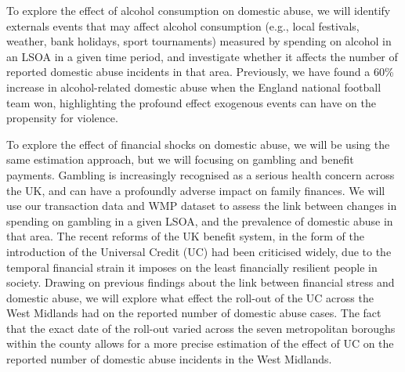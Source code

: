 \documentclass[11pt, a4paper]{article}
\begin{document}
To explore the effect of alcohol consumption on domestic abuse, we will identify externals events that may affect alcohol consumption (e.g., local festivals, weather, bank holidays, sport tournaments) measured by spending on alcohol in an LSOA in a given time period, and investigate whether it affects the number of reported domestic abuse incidents in that area. Previously, we have found a 60\% increase in alcohol-related domestic abuse when the England national football team won, highlighting the profound effect exogenous events can have on the propensity for violence. 

To explore the effect of financial shocks on domestic abuse, we will be using the same estimation approach, but we will focusing on gambling and benefit payments. Gambling is increasingly recognised as a serious health concern across the UK, and can have a profoundly adverse impact on family finances. We will use our transaction data and WMP dataset to assess the link between changes in spending on gambling in a given LSOA, and the prevalence of domestic abuse in that area. The recent reforms of the UK benefit system, in the form of the introduction of the Universal Credit (UC) had been criticised widely, due to the temporal financial strain it imposes on the least financially resilient people in society. Drawing on previous findings about the link between financial stress and domestic abuse, we will explore what effect the roll-out of the UC across the West Midlands had on the reported number of domestic abuse cases. The fact that the exact date of the roll-out varied across the seven metropolitan boroughs within the county allows for a more precise estimation of the effect of UC on the reported number of domestic abuse incidents in the West Midlands.
 
\end{document}

